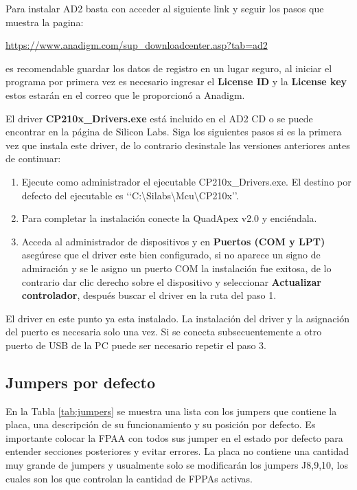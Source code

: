 Para instalar AD2 basta con acceder al siguiente link y seguir los pasos que muestra la pagina:

	\begin{center}
		\url{https://www.anadigm.com/sup_downloadcenter.asp?tab=ad2}
	\end{center}
es recomendable guardar los datos de registro en un lugar seguro, al iniciar el programa por primera vez es necesario ingresar el \textbf{License ID} y la \textbf{License key} estos estarán en el correo que le proporcionó a Anadigm. 

El driver \textbf{CP210x\_{}Drivers.exe} está incluido en el AD2 CD o se puede encontrar en la página de Silicon Labs. Siga los siguientes pasos si es la primera vez que instala este driver, de lo contrario desinstale las versiones anteriores antes de continuar:

\begin{enumerate}
	\item Ejecute como administrador el ejecutable  CP210x\_{}Drivers.exe. El destino por defecto del ejecutable es ‘‘C:\textbackslash{}Silabs\textbackslash{}Mcu\textbackslash{}CP210x’’.
	\item Para completar la instalación conecte la QuadApex v2.0 y enciéndala.
	\item Acceda al administrador de dispositivos y en \textbf{Puertos (COM y LPT)} asegúrese que el driver este bien configurado, si no aparece un signo de admiración y se le asigno un puerto COM  la instalación fue exitosa, de lo contrario dar clic derecho sobre el dispositivo y seleccionar \textbf{Actualizar controlador}, después buscar el  driver en la ruta del paso 1.
\end{enumerate}

El driver en este punto ya esta instalado. La instalación del driver y la asignación del puerto es necesaria solo una vez. Si se conecta subsecuentemente a otro puerto de USB de la PC puede ser necesario repetir el paso 3.

	
	\subsection{Jumpers por defecto}
	
	En la Tabla \ref{tab:jumpers} se muestra una lista con los jumpers que contiene la placa, una descripción de su funcionamiento y su posición por defecto. Es importante colocar la FPAA con todos sus jumper en el estado por defecto para entender secciones posteriores y evitar errores. La placa no contiene una cantidad muy grande de jumpers y usualmente solo se modificarán los jumpers J8,9,10, los cuales son los que controlan la cantidad de FPPAs activas.
	
